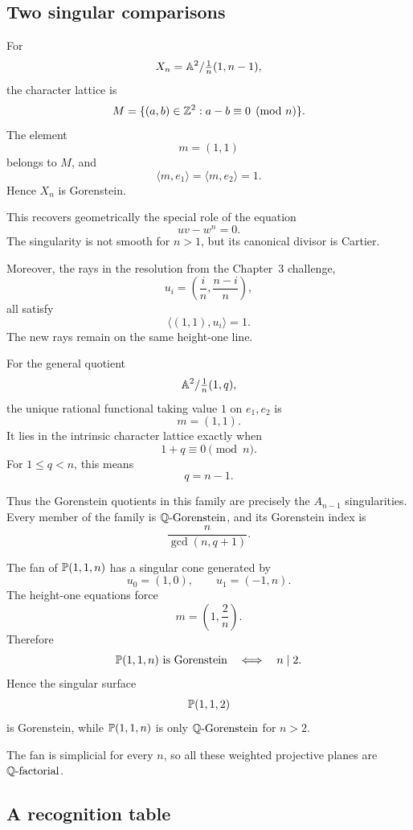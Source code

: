 \subsection{Two singular comparisons}

\begin{example}
For
\[
X_n=\mathbb{A}^2/\tfrac1n(1,n-1),
\]
the character lattice is
\[
M
=
\{(a,b)\in\mathbb{Z}^2:a-b\equiv0\pmod n\}.
\]
The element
\[
m=(1,1)
\]
belongs to \(M\), and
\[
\langle m,e_1\rangle
=
\langle m,e_2\rangle
=
1.
\]
Hence \(X_n\) is Gorenstein.

This recovers geometrically the special role of the equation
\[
uv-w^n=0.
\]
The singularity is not smooth for \(n>1\), but its canonical divisor
is Cartier.

Moreover, the rays in the resolution from the Chapter~3 challenge,
\[
u_i=
\left(\frac{i}{n},\frac{n-i}{n}\right),
\]
all satisfy
\[
\langle(1,1),u_i\rangle=1.
\]
The new rays remain on the same height-one line.
\end{example}

\begin{observation}
For the general quotient
\[
\mathbb{A}^2/\tfrac1n(1,q),
\]
the unique rational functional taking value \(1\) on \(e_1,e_2\) is
\[
m=(1,1).
\]
It lies in the intrinsic character lattice exactly when
\[
1+q\equiv0\pmod n.
\]
For \(1\leq q<n\), this means
\[
q=n-1.
\]

Thus the Gorenstein quotients in this family are precisely the
\(A_{n-1}\) singularities. Every member of the family is
\(\mathbb{Q}\text{-Gorenstein}\), and its Gorenstein index is
\[
\frac{n}{\gcd(n,q+1)}.
\]
\end{observation}

\begin{example}
The fan of \(\mathbb{P}(1,1,n)\) has a singular cone generated by
\[
u_0=(1,0),
\qquad
u_1=(-1,n).
\]
The height-one equations force
\[
m=\left(1,\frac{2}{n}\right).
\]
Therefore
\[
\mathbb{P}(1,1,n)
\text{ is Gorenstein}
\quad\Longleftrightarrow\quad
n\mid2.
\]
Hence the singular surface
\[
\mathbb{P}(1,1,2)
\]
is Gorenstein, while \(\mathbb{P}(1,1,n)\) is only \(\mathbb{Q}\text{-Gorenstein}\) for
\(n>2\).

The fan is simplicial for every \(n\), so all these weighted
projective planes are \(\mathbb{Q}\text{-factorial}\).
\end{example}

\subsection{A recognition table}

